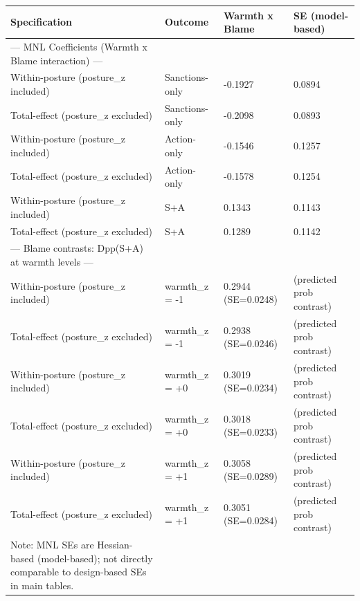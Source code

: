 
\begin{tabular}[t]{llll}
\toprule
Specification & Outcome & Warmth x Blame & SE (model-based)\\
\midrule
--- MNL Coefficients (Warmth x Blame interaction) --- &  &  & \\
Within-posture (posture\_z included) & Sanctions-only & -0.1927 & 0.0894\\
Total-effect (posture\_z excluded) & Sanctions-only & -0.2098 & 0.0893\\
Within-posture (posture\_z included) & Action-only & -0.1546 & 0.1257\\
Total-effect (posture\_z excluded) & Action-only & -0.1578 & 0.1254\\
Within-posture (posture\_z included) & S+A & 0.1343 & 0.1143\\
Total-effect (posture\_z excluded) & S+A & 0.1289 & 0.1142\\
--- Blame contrasts: Dpp(S+A) at warmth levels --- &  &  & \\
Within-posture (posture\_z included) & warmth\_z = -1 & 0.2944 (SE=0.0248) & (predicted prob contrast)\\
Total-effect (posture\_z excluded) & warmth\_z = -1 & 0.2938 (SE=0.0246) & (predicted prob contrast)\\
Within-posture (posture\_z included) & warmth\_z = +0 & 0.3019 (SE=0.0234) & (predicted prob contrast)\\
Total-effect (posture\_z excluded) & warmth\_z = +0 & 0.3018 (SE=0.0233) & (predicted prob contrast)\\
Within-posture (posture\_z included) & warmth\_z = +1 & 0.3058 (SE=0.0289) & (predicted prob contrast)\\
Total-effect (posture\_z excluded) & warmth\_z = +1 & 0.3051 (SE=0.0284) & (predicted prob contrast)\\
Note: MNL SEs are Hessian-based (model-based); not directly comparable to design-based SEs in main tables. &  &  & \\
\bottomrule
\end{tabular}
